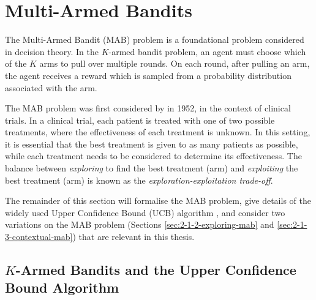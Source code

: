 











\section{Multi-Armed Bandits}
\label{sec:2-1-mab}

    The Multi-Armed Bandit (MAB) problem \cite{mab_book} is a foundational problem considered in decision theory. In the $K$-armed bandit problem, an agent must choose which of the $K$ arms to pull over multiple rounds. On each round, after pulling an arm, the agent receives a reward which is sampled from a probability distribution associated with the arm.
    
    The MAB problem was first considered by \citet{mab_og} in 1952, in the context of clinical trials. In a clinical trial, each patient is treated with one of two possible treatments, where the effectiveness of each treatment is unknown. In this setting, it is essential that the best treatment is given to as many patients as possible, while each treatment needs to be considered to determine its effectiveness. The balance between \textit{exploring} to find the best treatment (arm) and \textit{exploiting} the best treatment (arm) is known as the \textit{exploration-exploitation trade-off}.

    The remainder of this section will formalise the MAB problem, give details of the widely used Upper Confidence Bound (UCB) algorithm \cite{ucb}, and consider two variations on the MAB problem (Sections \ref{sec:2-1-2-exploring-mab} and \ref{sec:2-1-3-contextual-mab}) that are relevant in this thesis.







\subsection{$K$-Armed Bandits and the Upper Confidence Bound Algorithm} %
\label{sec:2-1-1-ucb}

